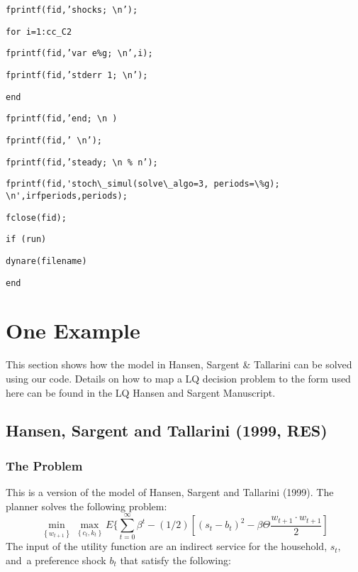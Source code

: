 \documentclass[letter, fleqn, 11pt]{article}
\begin{document}
\begin{enumerate}
\begin{itemize}
\texttt{fprintf(fid,'shocks; \textbackslash n');}

\texttt{for i=1:cc\_C2}

\qquad \texttt{fprintf(fid,'var e\%g; \textbackslash n',i);}

\qquad \texttt{fprintf(fid,'stderr 1;  \textbackslash n');}

\texttt{end}

\texttt{fprintf(fid,'end; \textbackslash n )}%

\texttt{fprintf(fid,' \textbackslash n');}

\texttt{fprintf(fid,'steady; \textbackslash n \%
n');}

\begin{verbatim}fprintf(fid,'stoch\_simul(solve\_algo=3, periods=\%g); \n',irfperiods,periods); \end{verbatim}

\texttt{fclose(fid);}

\texttt{if (run)}

\qquad \texttt{dynare(filename)}

\texttt{end}
\end{itemize}
\end{enumerate}

\section{One Example}

This section shows how the model in Hansen, Sargent \& Tallarini can be solved using our code. Details on how to map a LQ decision problem to the form used here can be found in the LQ Hansen and Sargent Manuscript.


\subsection{Hansen, Sargent and Tallarini (1999, RES)}

\subsubsection{The Problem}

This is a version of the model of Hansen, Sargent and Tallarini (1999). The
planner solves the following problem:%
\begin{equation*}
\min_{\left\{ w_{t+1}\right\} }\max_{\left\{ c_{t},k_{t}\right\}
}E\{\sum_{t=0}^{\infty }\beta ^{t}-\left( 1/2\right) \left[
(s_{t}-b_{t})^{2}-\beta \Theta \frac{w_{t+1}\cdot w_{t+1}}{2}\right]
\end{equation*}%
The input of the utility function are an indirect service for the household, $%
s_{t},$ and\ a preference shock $b_{t}$ that satisfy the following:
\end{document}

